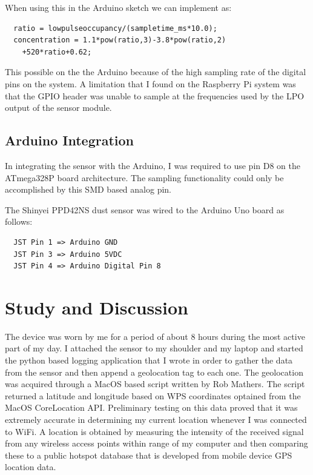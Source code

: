 \documentclass{sigchi}
\begin{document}
When using this in the Arduino sketch we can implement as:

\begin{verbatim}
  ratio = lowpulseoccupancy/(sampletime_ms*10.0);
  concentration = 1.1*pow(ratio,3)-3.8*pow(ratio,2)
    +520*ratio+0.62;
\end{verbatim}

This possible on the the Arduino because of the high sampling rate of the
digital pins on the system. A limitation that I found on the Raspberry Pi system
was that the GPIO header was unable to sample at the frequencies used by the LPO
output of the sensor module.

\subsection{Arduino Integration}

In integrating the sensor with the Arduino, I was required to use pin D8
on the ATmega328P board architecture. The sampling functionality could only be accomplished
by this SMD based analog pin.

The Shinyei PPD42NS dust sensor was wired to the Arduino Uno board as follows:

\begin{verbatim}
  JST Pin 1 => Arduino GND
  JST Pin 3 => Arduino 5VDC
  JST Pin 4 => Arduino Digital Pin 8
\end{verbatim}

\section{Study and Discussion}

The device was worn by me for a period of about 8 hours during the most active
part of my day. I attached the sensor to my shoulder and my laptop and started
the python based logging application that I wrote in order to gather the data
from the sensor and then append a geolocation tag to each one. The geolocation
was acquired through a MacOS based script written by Rob Mathers. \cite{whereami}
The script returned a latitude and longitude based on WPS coordinates optained from
the MacOS CoreLocation API. Preliminary testing on this data proved that it was
extremely accurate in determining my current location whenever I was connected to
WiFi. A location is obtained by measuring the intensity of the received signal from
any wireless access points within range of my computer and then comparing these
to a public hotspot database that is developed from mobile device GPS location data. \cite{zahradnik}
\end{document}
